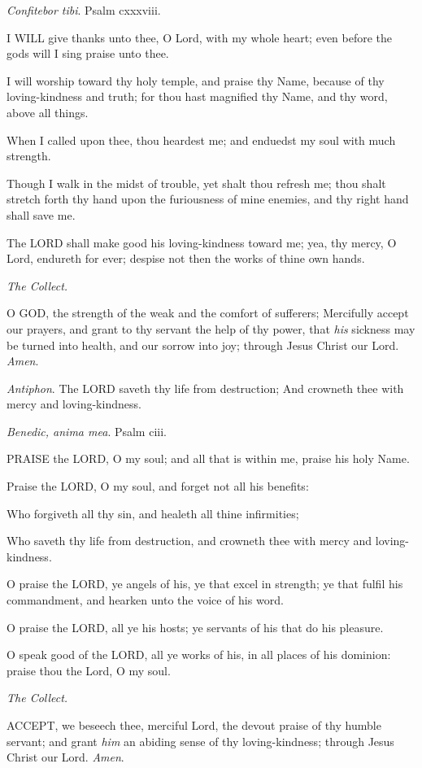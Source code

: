 \emph{Confitebor
tibi}. Psalm cxxxviii.

I
WILL give thanks unto thee, O Lord, with my whole heart; even before
the gods will I sing praise unto thee.

I will worship toward thy holy temple, and praise
thy Name, because of thy loving-kindness and truth; for thou hast magnified
thy Name, and thy word, above all things.

When I called upon thee, thou heardest me; and enduedst
my soul with much strength.

Though I walk in the midst of trouble, yet shalt
thou refresh me; thou shalt stretch forth thy hand upon the furiousness
of mine enemies, and thy right hand shall save me.

The LORD shall make good his
loving-kindness toward me; yea, thy mercy, O Lord, endureth for ever;
despise not then the works of thine own hands.

\emph{The
Collect.}

O
GOD, the strength of the weak and the comfort of sufferers; Mercifully
accept our prayers, and grant to thy servant the help of thy power,
that \emph{his} sickness may be turned into health, and our sorrow
into joy; through Jesus Christ our Lord. \emph{Amen}.

\emph{Antiphon}.
The LORD saveth thy life from destruction; And
crowneth thee with mercy and loving-kindness.

\emph{Benedic,
anima mea}. Psalm ciii.

PRAISE
the LORD, O my soul; and all that is within me,
praise his holy Name.

Praise the LORD, O my soul,
and forget not all his benefits:

Who forgiveth all thy sin, and healeth all thine
infirmities;

Who saveth thy life from destruction, and crowneth
thee with mercy and loving-kindness.

O praise the LORD, ye angels
of his, ye that excel in strength; ye that fulfil his commandment, and
hearken unto the voice of his word.

O praise the LORD, all ye
his hosts; ye servants of his that do his pleasure.

O speak good of the LORD,
all ye works of his, in all places of his dominion: praise thou the
Lord, O my soul.

\emph{The
Collect.}

ACCEPT,
we beseech thee, merciful Lord, the devout praise of thy humble servant;
and grant \emph{him} an abiding sense of thy loving-kindness; through
Jesus Christ our Lord. \emph{Amen}.

